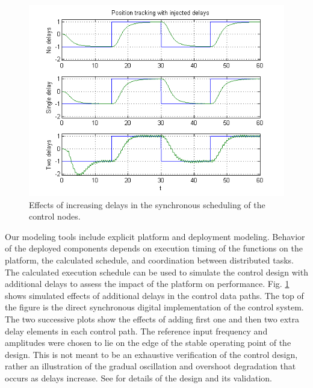 \begin{figure}
\centering
\includegraphics[width=0.9\columnwidth]{figures/delays.png}
    \caption{Effects of increasing delays in the synchronous scheduling of the control nodes.}
    \label{fig:delays}
\end{figure}


Our modeling tools include explicit platform and deployment modeling\cite{modeling:aces08}. 
Behavior of the deployed components depends on execution timing of the functions on the platform, 
the calculated schedule, and coordination between distributed tasks. The calculated execution schedule 
can be used to simulate the control design with additional delays to assess the impact of the platform 
on performance.  Fig. \ref{fig:delays} shows simulated effects of additional delays in the control data 
paths.  The top of the figure is the direct synchronous digital implementation of the control system.  
The two successive plots show the effects of adding first one and then two extra delay elements in each 
control path.  The reference input frequency and amplitudes were chosen to lie on the edge of the stable 
operating point of the design.  This is not meant to be an exhaustive verification of the control design, 
rather an illustration of the gradual oscillation and overshoot degradation that occurs as delays increase.  
See \cite{quad:passcontrol} for details of the design and its validation.

